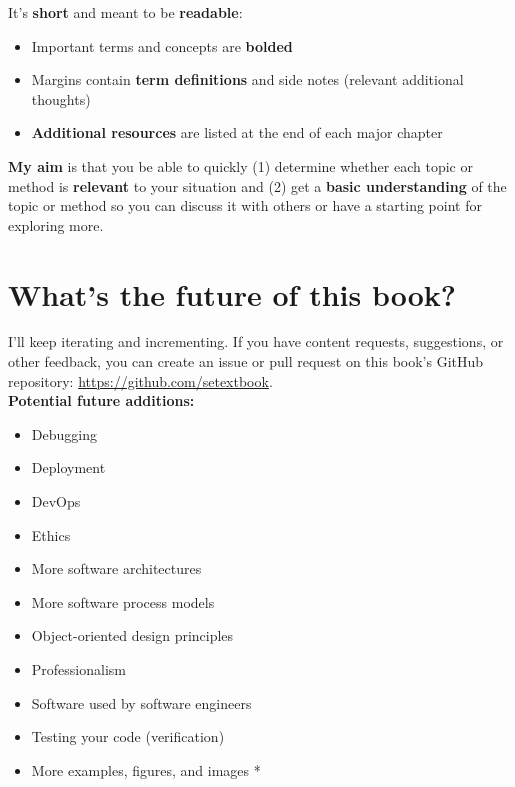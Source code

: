 \noindent It's \textbf{short} and meant to be \textbf{readable}:\\

\begin{itemize}
\item Important terms and concepts are \textbf{bolded}
\item Margins contain \textbf{term definitions} and side notes (relevant additional thoughts)
\item \textbf{Additional resources} are listed at the end of each major chapter\\
\end{itemize}

\textbf{My aim} is that you be able to quickly (1) determine whether each topic or method is \textbf{relevant} to your situation and (2) get a \textbf{basic understanding} of the topic or method so you can discuss it with others or have a starting point for exploring more.

\section{What's the future of this book?}

I'll keep iterating and incrementing. If you have content requests, suggestions, or other feedback, you can create an issue or pull request on this book's GitHub repository: \url{https://github.com/setextbook}. \\

\noindent \textbf{Potential future additions:}\\

\begin{itemize}
    \item Debugging
    \item Deployment
    \item DevOps
    \item Ethics
    \item More software architectures
    \item More software process models
    \item Object-oriented design principles
    \item Professionalism
    \item Software used by software engineers
    \item Testing your code (verification)
    \item More examples, figures, and images *
\end{itemize}

